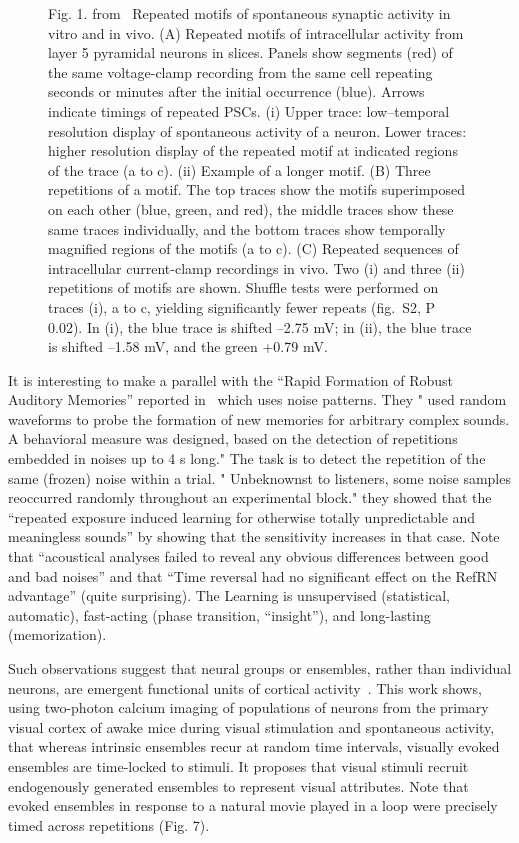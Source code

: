 \documentclass[brainsci, %
               review,submit,pdftex,moreauthors%
               ]{Definitions/mdpi}
\begin{document}
\begin{figure}
\centering
\caption{Fig. 1. from~\citep{ikegaya_synfire_2004} Repeated motifs of spontaneous synaptic activity in vitro and in vivo. (A) Repeated motifs of intracellular activity from layer 5 pyramidal neurons in slices. Panels show segments (red) of the same voltage-clamp recording from the same cell repeating seconds or minutes after the initial occurrence (blue). Arrows indicate timings of repeated PSCs. (i) Upper trace: low--temporal resolution display of spontaneous activity of a neuron. Lower traces: higher resolution display of the repeated motif at indicated regions of the trace (a to c). (ii) Example of a longer motif. (B) Three repetitions of a motif. The top traces show the motifs superimposed on each other (blue, green, and red), the middle traces show these same traces individually, and the bottom traces show temporally magnified regions of the motifs (a to c). (C) Repeated sequences of intracellular current-clamp recordings in vivo. Two (i) and three (ii) repetitions of motifs are shown. Shuffle tests were performed on traces (i), a to c, yielding significantly fewer repeats (fig.~S2, P  0.02). In (i), the blue trace is shifted --2.75 mV; in (ii), the blue trace is shifted --1.58 mV, and the green +0.79 mV.}\label{fig:Ikegaya2004}
\end{figure}

It is interesting to make a parallel with the ``Rapid Formation of Robust Auditory Memories'' reported in~\citep{agus_rapid_2010} which uses noise patterns. They " used random waveforms to probe the formation of new memories for arbitrary complex sounds. A behavioral measure was designed, based on the detection of repetitions embedded in noises up to 4 s long." The task is to detect the repetition of the same (frozen) noise within a trial. " Unbeknownst to listeners, some noise samples reoccurred randomly throughout an experimental block." they showed that the ``repeated exposure induced learning for otherwise totally unpredictable and meaningless sounds'' by showing that the sensitivity increases in that case. Note that ``acoustical analyses failed to reveal any obvious differences between good and bad noises'' and that ``Time reversal had no significant effect on the RefRN advantage'' (quite surprising). The Learning is unsupervised (statistical, automatic), fast-acting (phase transition, ``insight''), and long-lasting (memorization).

Such observations suggest that neural groups or ensembles, rather than individual neurons, are emergent functional units of cortical activity~\citep{miller_visual_2014}. This work shows, using two-photon calcium imaging of populations of neurons from the primary visual cortex of awake mice during visual stimulation and spontaneous activity, that whereas intrinsic ensembles recur at random time intervals, visually evoked ensembles are time-locked to stimuli. It proposes that visual stimuli recruit endogenously generated ensembles to represent visual attributes. Note that evoked ensembles in response to a natural movie played in a loop were precisely timed across repetitions (Fig. 7).
\end{document}
